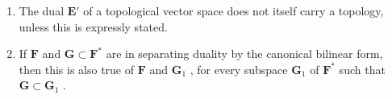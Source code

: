 \begin{enumerate}
\def\labelenumi{\arabic{enumi})}
\setcounter{enumi}{1}
\item
  The dual \(\mathbf{E}'\) of a topological vector space does not itself carry a topology, unless this is expressly stated.
\item
  If \(\mathbf{F}\) and \(\mathbf{G} \subset \mathbf{F}^*\) are in separating duality by the canonical bilinear form, then this is also true of \(\mathbf{F}\) and \(\mathbf{G}_1\) , for every subspace \(\mathbf{G}_1\) of \(\mathbf{F}^*\) such that \(\mathbf{G} \subset \mathbf{G}_1\) .
\end{enumerate}


